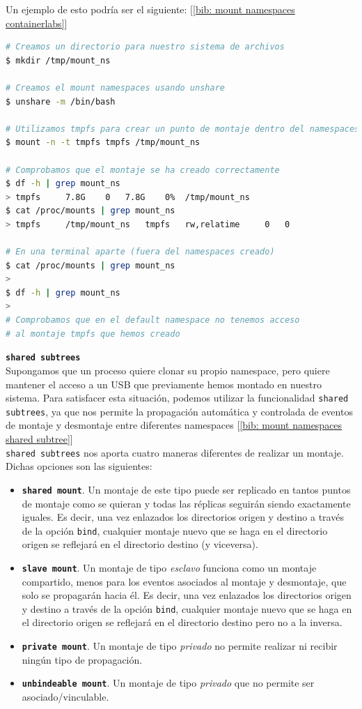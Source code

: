 \documentclass[a4paper, oneside, 12pt]{book}
\begin{document}
	\noindent Un ejemplo de esto podría ser el siguiente: [\ref{bib: mount namespaces containerlabs}]
	\begin{lstlisting}[language=bash, caption={Uso de \texttt{mount namespaces} con ``tmpfs''}]
# Creamos un directorio para nuestro sistema de archivos
$ mkdir /tmp/mount_ns

# Creamos el mount namespaces usando unshare
$ unshare -m /bin/bash

# Utilizamos tmpfs para crear un punto de montaje dentro del namespaces
$ mount -n -t tmpfs tmpfs /tmp/mount_ns

# Comprobamos que el montaje se ha creado correctamente
$ df -h | grep mount_ns
> tmpfs		7.8G	0	7.8G	0%	/tmp/mount_ns
$ cat /proc/mounts | grep mount_ns
> tmpfs		/tmp/mount_ns	tmpfs	rw,relatime		0	0

# En una terminal aparte (fuera del namespaces creado)
$ cat /proc/mounts | grep mount_ns
>
$ df -h | grep mount_ns
>
# Comprobamos que en el default namespace no tenemos acceso 
# al montaje tmpfs que hemos creado
	\end{lstlisting}
	
	\pagebreak
	
	\noindent \textbf{\large \texttt{shared subtrees}}\\
	
	\noindent Supongamos que un proceso quiere clonar su propio namespace, pero quiere mantener el acceso a un USB que previamente hemos montado en nuestro sistema. Para satisfacer esta situación, podemos utilizar la funcionalidad \texttt{shared subtrees}, ya que nos permite la propagación automática y controlada de eventos de montaje y desmontaje entre diferentes namespaces [\ref{bib: mount namespaces shared subtree}] \\
	
	\noindent \texttt{shared subtrees} nos aporta cuatro maneras diferentes de realizar un montaje. Dichas opciones son las siguientes:
	\begin{itemize}
		\item \textbf{\texttt{shared mount}}. Un montaje de este tipo puede ser replicado en tantos puntos de montaje como se quieran y todas las réplicas seguirán siendo exactamente iguales. Es decir, una vez enlazados los directorios origen y destino a través de la opción \texttt{bind}, cualquier montaje nuevo que se haga en el directorio origen se reflejará en el directorio destino (y viceversa).
		\item \textbf{\texttt{slave mount}}. Un montaje de tipo \textit{esclavo} funciona como un montaje compartido, menos para los eventos asociados al montaje y desmontaje, que solo se propagarán hacia él. Es decir, una vez enlazados los directorios origen y destino a través de la opción \texttt{bind}, cualquier montaje nuevo que se haga en el directorio origen se reflejará en el directorio destino pero no a la inversa.
		\item \textbf{\texttt{private mount}}. Un montaje de tipo \textit{privado} no permite realizar ni recibir ningún tipo de propagación.
		\item \textbf{\texttt{unbindeable mount}}. Un montaje de tipo \textit{privado} que no permite ser asociado/vinculable.
	\end{itemize}
\end{document}

